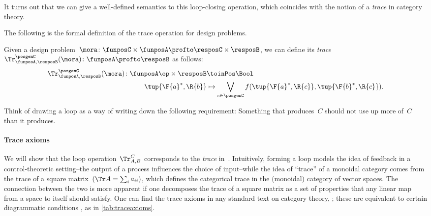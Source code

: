 It turns out that we can give a well-defined semantics to this loop-closing operation, which coincides with the notion of a \emph{trace} in category theory.

The following is the formal definition of the trace operation for design problems.

\begin{definition}
  \label{def:dp-trace}
  Given a design problem~$\mora\colon \funposC \times \funposA \profto \resposC \times \resposB$, we can define
  its \emph{trace}~$\Tr_{\funposA,\resposB}^\posgenC(\mora) \colon \funposA \profto \resposB$ as follows:
%
  \begin{equation}
    \label{eq:tracedef}
    \begin{aligned}
      \Tr_{\funposA,\resposB}^\posgenC(\mora) \colon  \funposA\op \times \resposB &\toinPos \Bool \\
      \tup{\F{a}^*, \R{b}} &\mapsto \bigvee_{c\in \posgenC}
      f(\tup{\F{a}^*, \R{c}},
      \tup{\F{b}^*, \R{c}}).
    \end{aligned}
  \end{equation}
\end{definition}


Think of drawing a loop as a way of writing down the following requirement: Something that produces~$C$ should not use up more of~$C$ than it produces.

\paragraph{Trace axioms}
We will show that the loop operation~$\Tr_{A,B}^C$ corresponds to the \emph{trace} in~\DP.
Intuitively, forming a loop models the idea of feedback in a control-theoretic setting--the output of a process influences the choice of input--while the idea of ``trace'' of a monoidal category comes from the trace of a square matrix~$(\Tr A = \sum_i a_{ii})$, which defines the categorical trace in the (monoidal) category of vector spaces.
The connection between the two is more apparent if one decomposes the trace of a square matrix as a set of properties that any linear map from a space to itself should satisfy. One can find the trace axioms in any standard text on category theory, \eg  \cite{mac2013categories}; these are equivalent to certain diagrammatic conditions \cite{joyal96}, as in \cref{tab:traceaxioms}.



